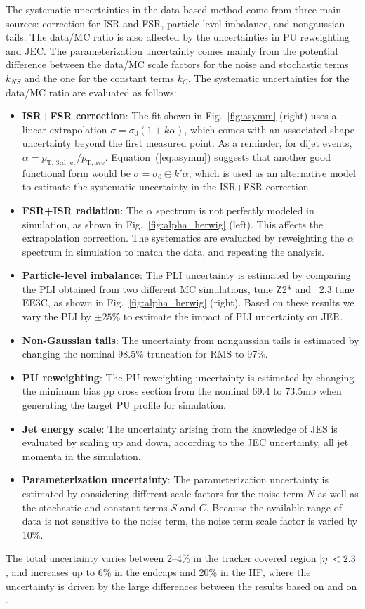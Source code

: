 \documentclass[11pt,twoside,a4paper,cmspaper,final,collab]{cms-tdr}
\begin{document}
The systematic uncertainties in the data-based method come from three main sources: correction for ISR and FSR, particle-level imbalance, and nongaussian tails. The data/MC ratio is also affected by the uncertainties in PU reweighting and JEC.
The parameterization uncertainty comes mainly from the potential difference between the data/MC scale factors for the noise and stochastic terms $k_{NS}$ and the one for the constant terms $k_{C}$.
The systematic uncertainties for the data/MC ratio are evaluated as follows:
\begin{itemize}
\item \textbf{ISR+FSR correction}: The fit shown in Fig.~\ref{fig:asymm} (right) uses a linear extrapolation $\sigma = \sigma_0(1+k\alpha)$, which comes with an associated shape uncertainty beyond the first measured point. As a reminder, for dijet events, $\alpha=p_\text{T, 3rd jet}/p_\mathrm{T, ave}$.
Equation~(\ref{eq:asymm}) suggests that another good functional form would be $\sigma = \sigma_0 \oplus k'\alpha$, which is used as an alternative model to estimate the systematic uncertainty in the ISR+FSR correction.
\item \textbf{FSR+ISR radiation}: The $\alpha$ spectrum is not perfectly modeled in simulation, as shown in Fig.~\ref{fig:alpha_herwig} (left). This affects the extrapolation correction. The systematics are evaluated by reweighting the $\alpha$ spectrum in simulation to match the data, and repeating the analysis.
\item \textbf{Particle-level imbalance}: The PLI uncertainty is estimated by comparing the PLI obtained from two different MC simulations,  tune Z2* and \HERWIGpp~2.3 tune EE3C, as shown in Fig.~\ref{fig:alpha_herwig} (right). Based on these results we vary the PLI by $\pm 25$\% to estimate the impact of PLI uncertainty on JER.
\item \textbf{Non-Gaussian tails}: The uncertainty from nongaussian tails is estimated by changing the nominal 98.5\% truncation for RMS to 97\%.
\item \textbf{PU reweighting}: The PU reweighting uncertainty is estimated by changing the minimum bias pp cross section from the nominal 69.4 to 73.5\unit{mb} when generating the target PU profile for simulation.
\item \textbf{Jet energy scale}: The uncertainty arising from the knowledge of JES is evaluated by scaling up and down, according to the JEC uncertainty, all jet momenta in the simulation.
\item \textbf{Parameterization uncertainty}: The parameterization uncertainty is estimated by considering different scale factors for the noise term $N$ as well as the stochastic and constant terms $S$ and $C$. Because the available range of data is not sensitive to the noise term, the noise term scale factor is varied by 10\%.
\end{itemize}
The total uncertainty varies between 2--4\% in the tracker covered region $\lvert \eta \rvert<2.3$, and increases up to 6\% in the endcaps and 20\% in the HF, where the uncertainty is driven by the large differences between the results based on  and on \HERWIGpp.
\end{document}
